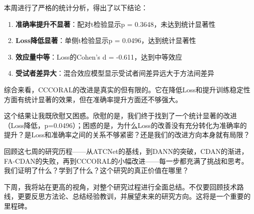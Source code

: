 \documentclass[12pt,a4paper]{ctexart}
\begin{document}
本周进行了严格的统计分析，得出了以下结论：

\begin{enumerate}
    \item \textbf{准确率提升不显著}：配对t检验显示p = 0.3648，未达到统计显著性
    \item \textbf{Loss降低显著}：单侧t检验显示p = 0.0496，达到统计显著性
    \item \textbf{效应量中等}：Loss的Cohen's d = -0.611，达到中等效应
    \item \textbf{受试者差异大}：混合效应模型显示受试者间差异远大于方法间差异
\end{enumerate}

综合来看，CCCORAL的改进是真实的但有限的。它在降低Loss和提升训练稳定性方面有统计显著的效果，但在准确率提升方面还不够强大。

这个结果让我既欣慰又困惑。欣慰的是，我们终于找到了一个统计显著的改进（Loss降低，p=0.0496）；困惑的是，为什么Loss的改善没有充分转化为准确率的提升？是Loss和准确率之间的关系不够紧密？还是我们的改进方向本身就有局限？

回顾这七周的研究历程——从ATCNet的基线，到DANN的突破，CDAN的渐进，FA-CDAN的失败，再到CCCORAL的小幅改进——每一步都充满了挑战和思考。我们证明了什么？学到了什么？这个研究的真正价值在哪里？

下周，我将站在更高的视角，对整个研究过程进行全面总结。不仅要回顾技术路线，更要反思方法论、总结经验教训，并展望未来的研究方向。这将是一个重要的里程碑。
\end{document}
